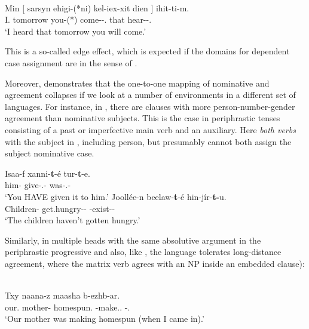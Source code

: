 \documentclass[output=paper]{langsci/langscibook}
\begin{document}
\ea%
    \label{ex:13.14} \parencite[115]{Baker2015}\\
    \gll    Min [ sarsyn ehigi-(*ni)  kel-iex-xit dien ]  ihit-ti-m.\\
    I.\Nom{} {} tomorrow you-(*\Acc)  come-\Fut{}-\Spl.\Sbj{} that {} hear-\Pst{}-\Fsg.\Sbj{}\\
    \glt    ‘I heard that tomorrow you will come.’
\z

This is a so-called edge effect, which is expected if the domains for dependent
case assignment are  in the sense of
\citet{Chomsky2001}.

Moreover, \citet{Baker2015} demonstrates that the one-to-one mapping of
nominative and agreement collapses if we look at a number of environments in a
different set of languages. For instance, in , there are clauses
with more person-number-gender agreement than nominative subjects. This is the
case in periphrastic tenses consisting of a past or imperfective main verb and
an auxiliary. Here \emph{both verbs}  with the subject in
, including person, but presumably cannot both assign the
subject nominative case.

\ea%
    \label{ex:13.15} \parencite[99]{Baker2015}
	\ea
	\gll  Isaa-f xanni-\textbf{t}-é  tur-\textbf{t}-e.\\
	    him-\Dat{}  give-\Tsg.\Sbj{}-\Pst{}  was-\Tsg.\Sbj{}-\Pst{}\\
	\glt     ‘You HAVE given it to him.’
	\ex
	\gll  Joollée-n beelaw-\textbf{t}-é  hin-jír-\textbf{t-}u.\\
        Children-\Mnom{}  get.hungry-\glossF{}-\Pst{} \Neg{}-exist-\glossF{}-\Dep{}\\
	\glt     ‘The children haven’t gotten hungry.’
    \z
\z

Similarly, in  multiple heads  with the same
absolutive argument in the periphrastic progressive
\citep[71--72]{Baker2015} and also, like  \parencite{PolPot2001}, the
language tolerates long-distance agreement, where the matrix verb agrees with an NP inside an embedded clause):

\ea%
    \label{ex:13.16} \citep[263]{Nichols2011}\\
    \gll  Txy naana-z maasha b-ezhb-ar.\\
            our.\Gen{}  mother-\Erg{}  homespun.\Bb{} \Bb{}-make.\Cvb.\Sim{} \Bb{}-\Prog.\Pst\\
    \glt  ‘Our mother was making homespun (when I came in).’
\z
\end{document}
